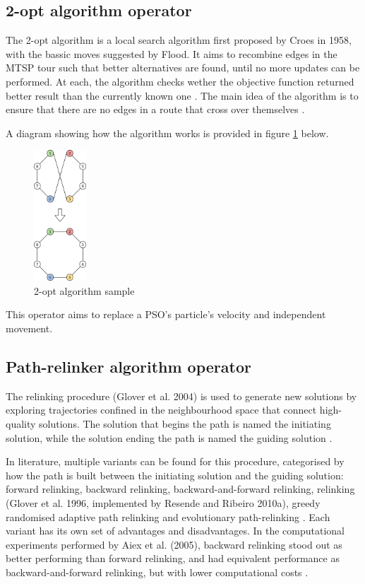 \documentclass[conference]{IEEEtran}
\begin{document}
\subsection{2-opt algorithm operator}
The 2-opt algorithm is a local search algorithm first proposed by Croes in 1958, with the bassic moves suggested by Flood.
It aims to recombine edges in the MTSP tour such that better alternatives are found, until no more updates can be performed.
At each, the algorithm checks wether the objective function returned better result than the currently known one \cite{b8}.
The main idea of the algorithm is to ensure that there are no edges in a route that cross over themselves \cite{b9}.

A diagram showing how the algorithm works is provided in figure \ref{2-opt algorithm sample} below.

\begin{figure}[h]
    \centering
    \includegraphics[width=0.175\textwidth]{images/2-opt.png}
    \caption{2-opt algorithm sample} \label{2-opt algorithm sample}
\end{figure}

This operator aims to replace a PSO's particle's velocity and independent movement.

\subsection{Path-relinker algorithm operator}
The relinking procedure (Glover et al. 2004) is used to generate new solutions by exploring trajectories confined in the neighbourhood space
that connect high-quality solutions. The solution that begins the path is named the initiating solution, while the solution
ending the path is named the guiding solution \cite{b10}.

In literature, multiple variants can be found for this procedure, categorised by how the path is built between the initiating
solution and the guiding solution: forward relinking, backward relinking, backward-and-forward relinking, relinking (Glover
et al. 1996, implemented by Resende and Ribeiro 2010a), greedy randomised adaptive path relinking and evolutionary path-relinking \cite{b11}.
Each variant has its own set of advantages and disadvantages. In the computational experiments performed by Aiex et al. (2005),
backward relinking stood out as better performing than forward relinking, and had equivalent performance as backward-and-forward relinking,
but with lower computational costs \cite{b11}.
\end{document}
